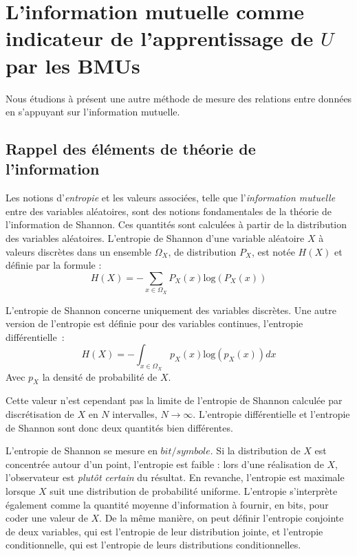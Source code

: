 \documentclass[../main]{subfiles}
\begin{document}
\section{L'information mutuelle comme indicateur de l'apprentissage de $U$ par les BMUs}

Nous étudions à présent une autre méthode de mesure des relations entre données en s'appuyant sur l'information mutuelle.
\subsection{Rappel des éléments de théorie de l'information}

Les notions d'\emph{entropie} et les valeurs associées, telle que l'\emph{information mutuelle} entre des variables aléatoires, sont des notions fondamentales de la théorie de l'information de Shannon. Ces quantités sont calculées à partir de la distribution des variables aléatoires.
L'entropie de Shannon d'une variable aléatoire $X$ à valeurs discrètes dans un ensemble $\Omega_X$, de distribution $P_X$, est notée $H(X)$ et définie par la formule : 
\begin{equation}
H(X) = - \sum_{x \in \Omega_X}{P_X(x)\textrm{log}(P_X(x))}
\end{equation}

L'entropie de Shannon concerne uniquement des variables discrètes.
Une autre version de l'entropie est définie pour des variables continues, l'entropie différentielle~:
\begin{equation}
    H(X) = - \int_{x \in \Omega_X}{p_X(x)\textrm{log}(p_X(x))dx}
\end{equation}
Avec $p_X$ la densité de probabilité de $X$.
    
Cette valeur n'est cependant pas la limite de l'entropie de Shannon calculée par discrétisation de $X$ en $N$ intervalles, $N \rightarrow \infty$.
L'entropie différentielle et l'entropie de Shannon sont donc deux quantités bien différentes.

L'entropie de Shannon se mesure en $bit/symbole$.
Si la distribution de $X$ est concentrée autour d'un point, l'entropie est faible : lors d'une réalisation de $X$, l'observateur est \emph{plutôt certain} du résultat. 
En revanche, l'entropie est maximale lorsque $X$ suit une distribution de probabilité uniforme.
L'entropie s'interprète également comme la quantité moyenne d'information à fournir, en bits, pour coder une valeur de $X$.
De la même manière, on peut définir l'entropie conjointe de deux variables, qui est l'entropie de leur distribution jointe, et l'entropie conditionnelle, qui est l'entropie de leurs distributions conditionnelles.
\end{document}
